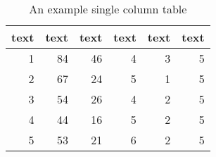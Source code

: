 \documentclass[11pt, twocolumn]{article}
\begin{document}
\lipsum[1]

\begin{table}[ht]
\centering
\begin{tabular}{rrrrrr}
  \toprule
  text & text & text & text & text & text  \\
  \midrule
  1 &  84 &  46 &   4 &   3 &   5 \\
    2 &  67 &  24 &   5 &   1 &   5 \\
    3 &  54 &  26 &   4 &   2 &   5 \\
    4 &  44 &  16 &   5 &   2 &   5 \\
    5 &  53 &  21 &   6 &   2 &   5 \\
   \bottomrule
\end{tabular}
\caption{An example single column table}
\label{tab:example}
\end{table}


\printbibliography


 
\end{document}
